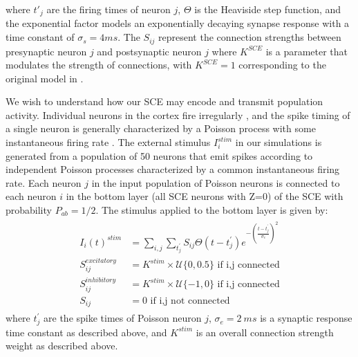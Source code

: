 \documentclass[12pt]{article}
\begin{document}
where $t'_j$ are the firing times of neuron $j$, $\Theta$ is the Heaviside step function, and the exponential factor models an exponentially decaying synapse response with a time constant of $\sigma_s = 4 ms$. 
The $S_{ij}$ represent the connection strengths between presynaptic neuron $j$ and postsynaptic neuron $j$ where $K^{SCE}$ is a parameter that modulates the strength of connections, with $K^{SCE}=1$ corresponding to the original model in \parencite{izhikevich2003}. 

We wish to understand how our SCE may encode and transmit population activity.
Individual neurons in the cortex fire irregularly \parencite{Maimon2009}, and the spike timing of a single neuron is generally characterized by a Poisson process with some instantaneous firing rate \parencite{Gerstein1964}.
The external stimulus $I_i^{stim}$ in our simulations is generated from a population of 50 neurons that emit spikes according to independent Poisson processes characterized by a common instantaneous firing rate.
Each neuron $j$ in the input population of Poisson neurons is connected to each neuron $i$ in the bottom layer (all SCE neurons with Z=0) of the SCE with probability $P_{ab} = 1/2$.
The stimulus applied to the bottom layer is given by:
\begin{align}
 \begin{split}
  I_i(t)^{stim} &= \sum_{i,j} \sum_{t^\prime_j} S_{ij}  \Theta(t-t^\prime_j)e^{-(\frac{t-t^\prime_j}{\sigma_e})^2}\\
  S_{ij}^{excitatory} &= K^{stim} \times \mathcal{U}\{0,0.5 \} \text{ if i,j connected}\\
  S_{ij}^{inhibitory} &= K^{stim} \times \mathcal{U}\{-1,0 \} \text{ if i,j connected}\\
  S_{ij} &= 0 \text{ if i,j not connected}
 \end{split}
\end{align}
where $t^\prime_j$ are the spike times of Poisson neuron $j$, $\sigma_e=2\ ms$ is a synaptic response time constant as described above, and $K^{stim}$ is an overall connection strength weight as described above.

\FloatBarrier
\end{document}
